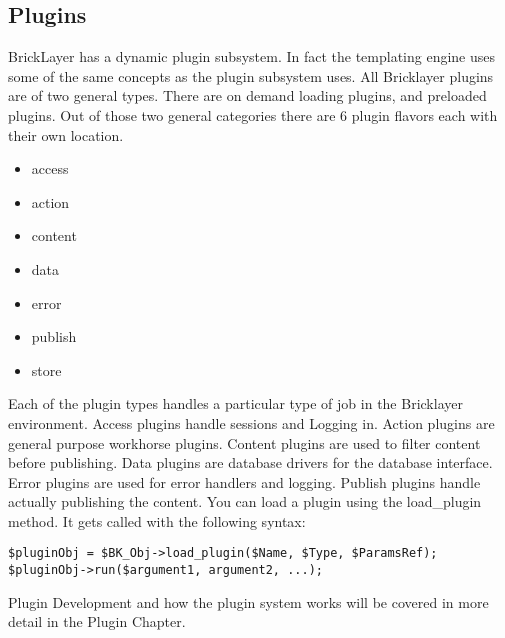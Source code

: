 \documentclass[letterpaper,10pt,oneside]{book}
\begin{document}
\subsection*{Plugins}
BrickLayer has a dynamic plugin subsystem. In fact the templating engine uses some of the same concepts as the plugin subsystem uses. All Bricklayer plugins are of two general types. There are on demand loading plugins, and preloaded plugins. Out of those two general categories there are 6 plugin flavors each with their own location.
\begin{itemize}
\item access
\item action
\item content
\item data
\item error
\item publish
\item store
\end{itemize}
Each of the plugin types handles a particular type of job in the Bricklayer environment. Access plugins handle sessions and Logging in. Action plugins are general purpose workhorse plugins. Content plugins are used to filter content before publishing. Data plugins are database drivers for the database interface. Error plugins are used for error handlers and logging. Publish plugins handle actually publishing the content. You can load a plugin using the load\_plugin method. It gets called with the following syntax:
\begin{verbatim}
$pluginObj = $BK_Obj->load_plugin($Name, $Type, $ParamsRef);
$pluginObj->run($argument1, argument2, ...);
\end{verbatim}
 Plugin Development and how the plugin system works will be covered in more detail in the Plugin Chapter.
\newpage
\end{document}
